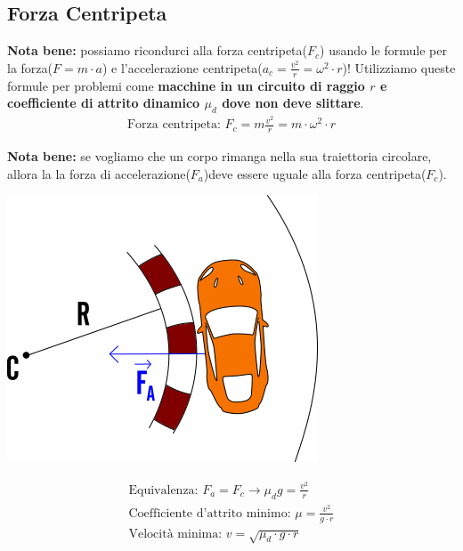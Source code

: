 \subsection{Forza Centripeta}
\textbf{Nota bene: } possiamo ricondurci alla forza centripeta($F_c$) usando le formule per la forza($F = m \cdot a$) e l'accelerazione centripeta($a_c = \frac{v^2}{r} = \omega^2 \cdot r $)! Utilizziamo queste formule per problemi come \textbf{macchine in un circuito di raggio $r$ e coefficiente di attrito dinamico $\mu_d$ dove non deve slittare}.
\\
\begin{gather*}
    \text{Forza centripeta: } F_c = m \frac{v^2}{r} = m \cdot \omega^2 \cdot r
\end{gather*}

\textbf{Nota bene: } se vogliamo che un corpo rimanga nella sua traiettoria circolare, allora la la forza di accelerazione($F_a$)deve essere uguale alla forza centripeta($F_c$).

\begin{center}
\includegraphics[width=0.7 \linewidth]
{Dinamica/forza-centripeta.png}
\end{center}
\begin{gather*}
    \text{Equivalenza: } F_a = F_c \rightarrow \mu_d  g = \frac{v^2}{r} \\
    \text{Coefficiente d'attrito minimo: } \mu = \frac{v^2}{g \cdot r} \\
    \text{Velocità minima: } v = \sqrt{\mu_d \cdot g \cdot r}
\end{gather*}